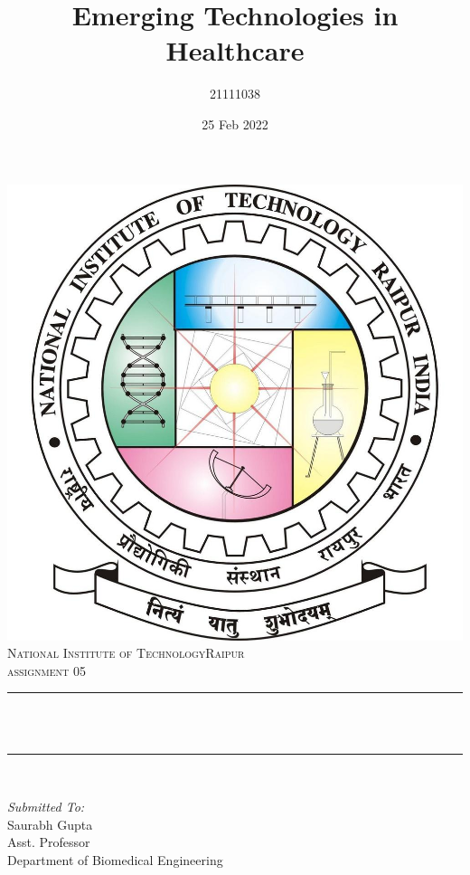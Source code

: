 \documentclass[12pt]{article}
\title{Emerging Technologies in Healthcare}								%
\author{21111038}								%
\date{25 Feb 2022}											%
\makeatletter
\let\thetitle\@title
\makeatother
\begin{document}

\begin{titlepage}
	\centering
    \vspace*{0.5 cm}
    \includegraphics[scale = 0.17]{logo.jpg}\\[1.0 cm]	%
    \textsc{\LARGE  National Institute of Technology\newline\newline Raipur}\\[2.0 cm]	%
	\textsc{\Large assignment 05}\\[0.5 cm]				%
	\rule{\linewidth}{0.2 mm} \\[0.4 cm]
	{ \huge \bfseries \thetitle}\\
	\rule{\linewidth}{0.2 mm} \\[1.5 cm]
	
	\begin{minipage}{0.4\textwidth}
		\begin{flushleft} \large
			\emph{Submitted To:}\\
			Saurabh Gupta\\
            Asst. Professor\\
            Department of Biomedical Engineering\\
			\end{flushleft}
			\end{minipage}~
			\begin{minipage}{0.4\textwidth}
            

\end{minipage}
\end{titlepage}
\end{document}
